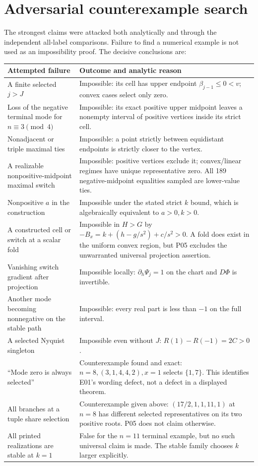 \documentclass[11pt]{article}
\begin{document}
\section{Adversarial counterexample search}
The strongest claims were attacked both analytically and through the
independent all-label comparisons. Failure to find a numerical example
is not used as an impossibility proof. The decisive conclusions are:
\begin{longtable}{@{}L{0.34\textwidth}L{0.61\textwidth}@{}}
\toprule Attempted failure&Outcome and analytic reason\\\midrule\endhead
A finite selected $j>J$&Impossible: its cell has upper endpoint
$\beta_{j-1}\le0<v$; convex cases select only zero.\\
Loss of the negative terminal mode for $n\equiv3\pmod4$&Impossible:
its exact positive upper midpoint leaves a nonempty interval of positive
vertices inside its strict cell.\\
Nonadjacent or triple maximal ties&Impossible: a point strictly between
equidistant endpoints is strictly closer to the vertex.\\
A realizable nonpositive-midpoint maximal switch&Impossible: positive
vertices exclude it; convex/linear regimes have unique representative zero.
All 189 negative-midpoint equalities sampled are lower-value ties.\\
Nonpositive $a$ in the construction&Impossible under the stated strict
$k$ bound, which is algebraically equivalent to $a>0,k>0$.\\
A constructed cell or switch at a scalar fold&Impossible in $H>G$ by
$-B_x=k+(h-g/s^2)+c/s^2>0$. A fold does exist in the uniform convex
region, but P05 excludes the unwarranted universal projection assertion.\\
Vanishing switch gradient after projection&Impossible locally:
$\partial_h\Psi_j=1$ on the chart and $D\Phi$ is invertible.\\
Another mode becoming nonnegative on the stable path&Impossible:
every real part is less than $-1$ on the full interval.\\
A selected Nyquist singleton&Impossible even without $J$:
$R(1)-R(-1)=2C>0$.\\
``Mode zero is always selected''&Counterexample found and exact:
$n=8,(3,1,4,4,2),x=1$ selects $\{1,7\}$. This identifies E01's
wording defect, not a defect in a displayed theorem.\\
All branches at a tuple share selection&Counterexample given above:
$(17/2,1,1,11,1)$ at $n=8$ has different selected representatives on
its two positive roots. P05 does not claim otherwise.\\
All printed realizations are stable at $k=1$&False for the $n=11$
terminal example, but no such universal claim is made. The stable family
chooses $k$ larger explicitly.\\\bottomrule
\end{longtable}
\end{document}
